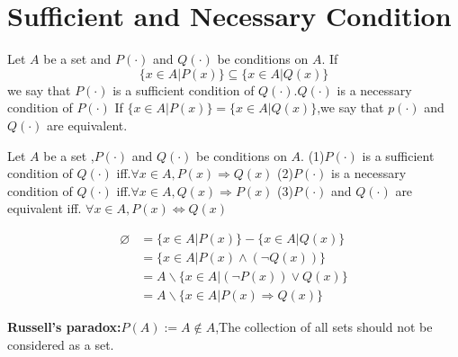 \documentclass{book}
\numberwithin{equation}{section}
\begin{document}
\section{Sufficient and Necessary Condition}
\begin{definitionenv}
    Let $A$ be a set and $P(\cdot)$ and $Q(\cdot)$ be conditions on $A$.
    If $$\{x\in A|P(x)\}\subseteq\{x\in A|Q(x)\}$$ we say that $P(\cdot)$ is a sufficient condition of $Q(\cdot)$.$Q(\cdot)$ is a necessary condition of $P(\cdot)$
    \newline
    If $\{x\in A|P(x)\}=\{x\in A|Q(x)\}$,we say that $p(\cdot)$ and $Q(\cdot)$ are equivalent.
\end{definitionenv}
\begin{propositionenv}
    Let $A$ be a set ,$P(\cdot)$ and $Q(\cdot)$ be conditions on $A$.
    \newline
    (1)$P(\cdot)$ is a sufficient condition of $Q(\cdot)$ iff.$\forall x\in A,P(x)\Rightarrow Q(x)$
    \newline
    (2)$P(\cdot) $ is a necessary condition of $Q(\cdot)$ iff.$\forall x\in A,Q(x)\Rightarrow P(x)$
    \newline
    (3)$P(\cdot)$ and $Q(\cdot)$ are equivalent iff. $\forall x\in A,P(x)\Leftrightarrow Q(x)$
\end{propositionenv}
\begin{proofenv}
\begin{align*}
    \varnothing&=\{x\in A|P(x)\}- \{x\in A|Q(x)\}\\
    &=\{x\in A|P(x)\wedge (\neg Q(x))\}\\
    &=A\backslash\{x\in A|(\neg P(x))\vee  Q(x)\}\\
    &=A\backslash\{x\in A |P(x)\Rightarrow Q(x)\}
\end{align*}
\end{proofenv}
\textbf{Russell's paradox:}$P(A):=A\notin A$,The collection of all sets should not be considered as a set.
\end{document}
